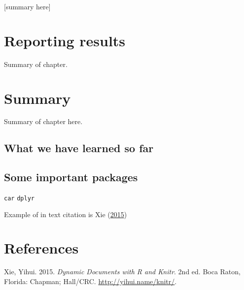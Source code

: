 \documentclass[]{book}
\theoremstyle{definition}
\theoremstyle{definition}
\theoremstyle{remark}
\begin{document}
{[}summary here{]}

\chapter{Reporting results}\label{reporting-results}

Summary of chapter.

\chapter{Summary}\label{summary-2}

Summary of chapter here.

\section{What we have learned so far}\label{what-we-have-learned-so-far}

\section{Some important packages}\label{some-important-packages}

\texttt{car} \texttt{dplyr}

Example of in text citation is Xie
(\protect\hyperlink{ref-xie2015}{2015})

\chapter{References}\label{references}

\hypertarget{refs}{}
\hypertarget{ref-xie2015}{}
Xie, Yihui. 2015. \emph{Dynamic Documents with R and Knitr}. 2nd ed.
Boca Raton, Florida: Chapman; Hall/CRC. \url{http://yihui.name/knitr/}.
\end{document}
